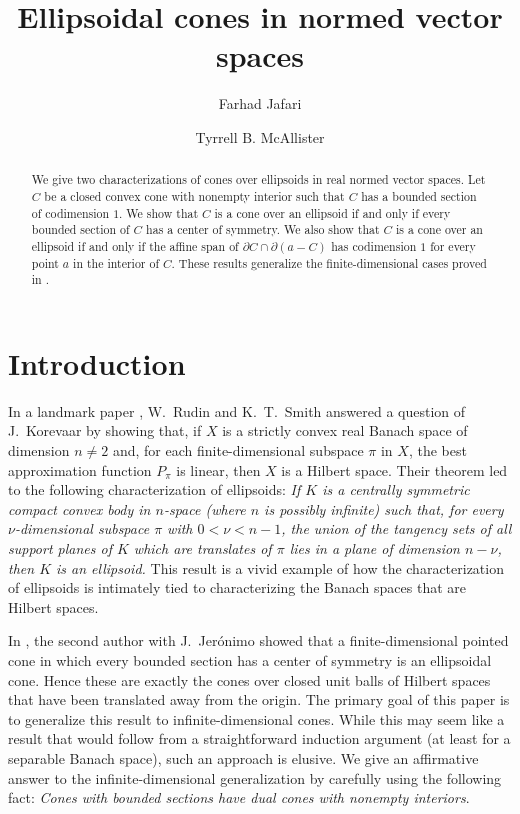 \documentclass[10pt]{amsart}
\title[Ellipsoidal cones]{   Ellipsoidal cones in normed vector spaces
}
\author[F.~Jafari \and T.~B.~McAllister]{   Farhad Jafari \and Tyrrell B. McAllister
}\address
\theoremstyle{definition}
\theoremstyle{remark}
\begin{document}
\begin{abstract}
   We give two characterizations of cones over ellipsoids in real 
   \linebreak 
   normed vector spaces.  Let $C$ be a closed convex cone with
   nonempty interior such that $C$ has a bounded section of
   codimension $1$.  We show that $C$ is a cone over an ellipsoid
   if and only if every bounded section of $C$ has a center of
   symmetry.  We also show that $C$ is a cone over an ellipsoid if
   and only if the affine span of ${\partial} C \cap {\partial}(a - C)$ has
   codimension $1$ for every point $a$ in the interior of $C$.
   These results generalize the finite-dimensional cases proved in
   \cite{JerMcA2013}.
\end{abstract}

\maketitle

\section{Introduction}
In a landmark paper \cite{Rudin}, W.~Rudin and K.~T.~Smith
answered a question of J.~Korevaar by showing that, if $ X $ is a
strictly convex real Banach space of dimension $ n \neq 2 $ and,
for each finite-dimensional subspace $ \pi $ in $ X $, the best
approximation function $ P_\pi $ is linear, then $X $ is a Hilbert
space.  Their theorem led to the following characterization of
ellipsoids: {\it If $K $ is a centrally symmetric compact convex
body in $n$-space (where $n$ is possibly infinite) such that, for
every $ \nu $-dimensional subspace $ \pi $ with $ 0 < \nu < n-1 $,
the union of the tangency sets of all support planes of $K $ which
are translates of $ \pi $ lies in a plane of dimension $n - \nu$,
then $ K $ is an ellipsoid.} This result is a vivid example of how
the characterization of ellipsoids is intimately tied to
characterizing the Banach spaces that are Hilbert spaces.

In \cite{JerMcA2013}, the second author with J.~Jer\'onimo showed
that a fi\-nite-di\-men\-sion\-al pointed cone in which every
bounded section has a center of symmetry is an ellipsoidal cone.
Hence these are exactly the cones over closed unit balls of
Hilbert spaces that have been translated away from the origin.
The primary goal of this paper is to generalize this result to
infinite-dimensional cones.  While this may seem like a result
that would follow from a straightforward induction argument (at
least for a separable Banach space), such an approach is elusive.
We give an affirmative answer to the infinite-dimensional
generalization by carefully using the following fact: \emph{Cones
with bounded sections have dual cones with nonempty interiors}.
\end{document}
